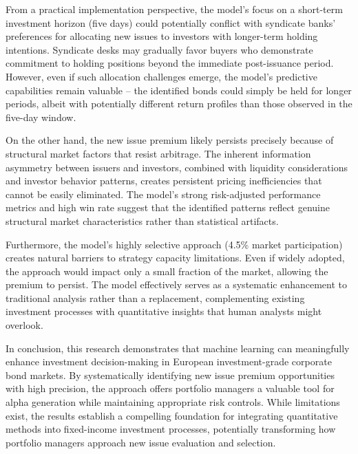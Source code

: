 From a practical implementation perspective, the model's focus on a short-term investment horizon (five days) could potentially conflict with syndicate banks' preferences for allocating new issues to investors with longer-term holding intentions. Syndicate desks may gradually favor buyers who demonstrate commitment to holding positions beyond the immediate post-issuance period. However, even if such allocation challenges emerge, the model's predictive capabilities remain valuable – the identified bonds could simply be held for longer periods, albeit with potentially different return profiles than those observed in the five-day window.

On the other hand, the new issue premium likely persists precisely because of structural market factors that resist arbitrage. The inherent information asymmetry between issuers and investors, combined with liquidity considerations and investor behavior patterns, creates persistent pricing inefficiencies that cannot be easily eliminated. The model's strong risk-adjusted performance metrics and high win rate suggest that the identified patterns reflect genuine structural market characteristics rather than statistical artifacts.

Furthermore, the model's highly selective approach (4.5\% market participation) creates natural barriers to strategy capacity limitations. Even if widely adopted, the approach would impact only a small fraction of the market, allowing the premium to persist. The model effectively serves as a systematic enhancement to traditional analysis rather than a replacement, complementing existing investment processes with quantitative insights that human analysts might overlook.

In conclusion, this research demonstrates that machine learning can meaningfully enhance investment decision-making in European investment-grade corporate bond markets. By systematically identifying new issue premium opportunities with high precision, the approach offers portfolio managers a valuable tool for alpha generation while maintaining appropriate risk controls. While limitations exist, the results establish a compelling foundation for integrating quantitative methods into fixed-income investment processes, potentially transforming how portfolio managers approach new issue evaluation and selection.